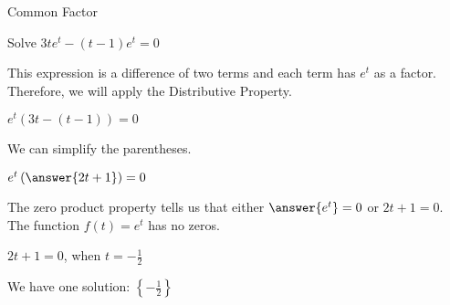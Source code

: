 \documentclass{ximera}
\begin{document}
\begin{example} Common Factor


Solve $3t e^t - (t-1) e^t = 0$

\begin{explanation}



This expression is a difference of two terms and each term has $e^t$ as a factor.  Therefore, we will apply the Distributive Property.



$e^t (3t - (t-1))= 0$


We can simplify the parentheses.



$e^t \left( \answer{2t + 1} \right)= 0$



The zero product property tells us that either $\answer{e^t} = 0$ or $2t + 1 = 0$.  \\

The function $f(t) = e^t$ has no zeros. 


$2t + 1 = 0$, when $t = -\frac{1}{2}$

We have one solution: $\left\{ -\frac{1}{2} \right\}$

\end{explanation}
\end{example}
\end{document}

